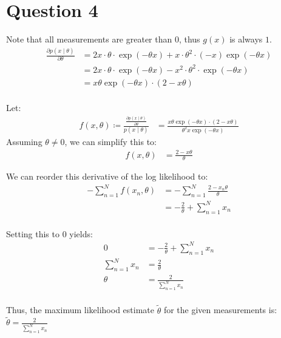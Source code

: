 \section*{Question 4}
Note that all measurements are greater than 0, thus $g(x)$ is always $1$.
\begin{align*}
	\frac{\partial p(x \mid \theta)}{\partial \theta} &= 2x \cdot \theta \cdot \exp(-\theta x) + x \cdot \theta^2 \cdot (-x) \exp(-\theta x) \\
	&= 2x \cdot \theta \cdot \exp(-\theta x) - x^2 \cdot \theta^2 \cdot \exp(-\theta x) \\
	&= x \theta \exp(-\theta x) \cdot (2 - x \theta) \\
\end{align*}

Let:
\begin{align*}
	f(x, \theta) \coloneqq \frac{\frac{\partial p(x \mid \theta)}{\partial \theta}}{p(x \mid \theta)} &= \frac{x \theta \exp(-\theta x) \cdot (2 - x \theta)}{\theta^2 x \exp(-\theta x) }
\end{align*}
Assuming $\theta \neq 0$, we can simplify this to:
\begin{align*}
	f(x, \theta) &= \frac{2 - x \theta}{\theta}
\end{align*}

We can reorder this derivative of the log likelihood to:
\begin{align*}
	-\sum_{n=1}^N f(x_n, \theta) &= -\sum_{n=1}^N \frac{2 - x_n \theta}{\theta} \\
	&= -\frac{2}{\theta} + \sum_{n=1}^N x_n \\
\end{align*}

Setting this to $0$ yields:
\begin{align*}
	0 &= -\frac{2}{\theta} + \sum_{n=1}^N x_n \\
	\sum_{n=1}^N x_n &= \frac{2}{\theta} \\
	\theta &= \frac{2}{\sum_{n=1}^N x_n} \\
\end{align*}

Thus, the maximum likelihood estimate $\widetilde{\theta}$ for the given measurements is: $\widetilde{\theta} = \frac{2}{\sum_{n=1}^N x_n}$
